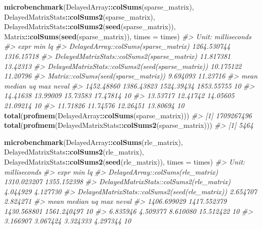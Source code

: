 \documentclass[]{book}
\newenvironment{Shaded}{\begin{snugshade}}{\end{snugshade}}
\newcommand{\KeywordTok}[1]{\textcolor[rgb]{0.13,0.29,0.53}{\textbf{#1}}}
\newcommand{\DataTypeTok}[1]{\textcolor[rgb]{0.13,0.29,0.53}{#1}}
\newcommand{\CommentTok}[1]{\textcolor[rgb]{0.56,0.35,0.01}{\textit{#1}}}
\newcommand{\OperatorTok}[1]{\textcolor[rgb]{0.81,0.36,0.00}{\textbf{#1}}}
\newcommand{\NormalTok}[1]{#1}
\begin{document}
\begin{Shaded}
\begin{Highlighting}[]
\KeywordTok{microbenchmark}\NormalTok{(DelayedArray}\OperatorTok{::}\KeywordTok{colSums}\NormalTok{(sparse_matrix),}
\NormalTok{               DelayedMatrixStats}\OperatorTok{::}\KeywordTok{colSums2}\NormalTok{(sparse_matrix),}
\NormalTok{               DelayedMatrixStats}\OperatorTok{::}\KeywordTok{colSums2}\NormalTok{(}\KeywordTok{seed}\NormalTok{(sparse_matrix)),}
\NormalTok{               Matrix}\OperatorTok{::}\KeywordTok{colSums}\NormalTok{(}\KeywordTok{seed}\NormalTok{(sparse_matrix)), }
               \DataTypeTok{times =}\NormalTok{ times)}
\CommentTok{#> Unit: milliseconds}
\CommentTok{#>                                               expr         min         lq}
\CommentTok{#>               DelayedArray::colSums(sparse_matrix) 1264.530744 1316.15718}
\CommentTok{#>        DelayedMatrixStats::colSums2(sparse_matrix)   11.817381   13.42313}
\CommentTok{#>  DelayedMatrixStats::colSums2(seed(sparse_matrix))   10.175122   11.20796}
\CommentTok{#>               Matrix::colSums(seed(sparse_matrix))    9.694093   11.23716}
\CommentTok{#>        mean     median         uq        max neval}
\CommentTok{#>  1452.48860 1386.43823 1524.39434 1853.55755    10}
\CommentTok{#>    14.41638   13.99009   15.73583   17.47814    10}
\CommentTok{#>    13.53717   12.41742   14.05605   21.09214    10}
\CommentTok{#>    11.71826   11.74576   12.26451   13.80694    10}
\KeywordTok{total}\NormalTok{(}\KeywordTok{profmem}\NormalTok{(DelayedArray}\OperatorTok{::}\KeywordTok{colSums}\NormalTok{(sparse_matrix)))}
\CommentTok{#> [1] 1709267496}
\KeywordTok{total}\NormalTok{(}\KeywordTok{profmem}\NormalTok{(DelayedMatrixStats}\OperatorTok{::}\KeywordTok{colSums2}\NormalTok{(sparse_matrix)))}
\CommentTok{#> [1] 5464}

\KeywordTok{microbenchmark}\NormalTok{(DelayedArray}\OperatorTok{::}\KeywordTok{colSums}\NormalTok{(rle_matrix),}
\NormalTok{               DelayedMatrixStats}\OperatorTok{::}\KeywordTok{colSums2}\NormalTok{(rle_matrix),}
\NormalTok{               DelayedMatrixStats}\OperatorTok{::}\KeywordTok{colSums2}\NormalTok{(}\KeywordTok{seed}\NormalTok{(rle_matrix)), }
               \DataTypeTok{times =}\NormalTok{ times)}
\CommentTok{#> Unit: milliseconds}
\CommentTok{#>                                            expr         min          lq}
\CommentTok{#>               DelayedArray::colSums(rle_matrix) 1310.023207 1355.152398}
\CommentTok{#>        DelayedMatrixStats::colSums2(rle_matrix)    4.044929    4.127730}
\CommentTok{#>  DelayedMatrixStats::colSums2(seed(rle_matrix))    2.654707    2.824271}
\CommentTok{#>         mean      median          uq         max neval}
\CommentTok{#>  1406.699029 1417.552379 1430.568801 1561.240497    10}
\CommentTok{#>     6.835946    4.509377    8.610080   15.512422    10}
\CommentTok{#>     3.166907    3.067424    3.324333    4.297344    10}


\end{Highlighting}
\end{Shaded}
\end{document}
